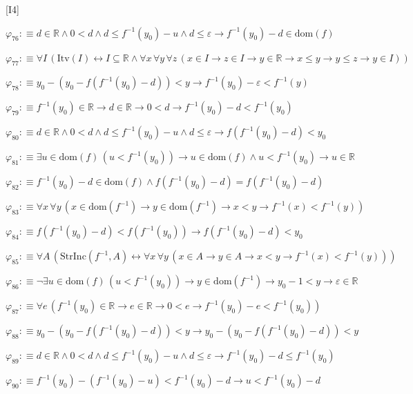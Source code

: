 \begin{fullproof}{[I4]}
\begin{abbrevlist}
\item $\varphi_{76} :\equiv d \in \mathbb{R} \land 0 < d \land d \leq f^{-1}(y_{0}) - u \land d \leq \varepsilon \to f^{-1}(y_{0}) - d \in \mathrm{dom}(f)$
\item $\varphi_{77} :\equiv \forall I\,(\mathrm{Itv}(I) \leftrightarrow I \subseteq \mathbb{R} \land \forall x\,\forall y\,\forall z\,(x \in I \to z \in I \to y \in \mathbb{R} \to x \leq y \to y \leq z \to y \in I))$
\item $\varphi_{78} :\equiv y_{0} - (y_{0} - f(f^{-1}(y_{0}) - d)) < y \to f^{-1}(y_{0}) - \varepsilon < f^{-1}(y)$
\item $\varphi_{79} :\equiv f^{-1}(y_{0}) \in \mathbb{R} \to d \in \mathbb{R} \to 0 < d \to f^{-1}(y_{0}) - d < f^{-1}(y_{0})$
\item $\varphi_{80} :\equiv d \in \mathbb{R} \land 0 < d \land d \leq f^{-1}(y_{0}) - u \land d \leq \varepsilon \to f(f^{-1}(y_{0}) - d) < y_{0}$
\item $\varphi_{81} :\equiv \exists u \in \mathrm{dom}(f)\,(u < f^{-1}(y_{0})) \to u \in \mathrm{dom}(f) \land u < f^{-1}(y_{0}) \to u \in \mathbb{R}$
\item $\varphi_{82} :\equiv f^{-1}(y_{0}) - d \in \mathrm{dom}(f) \land f(f^{-1}(y_{0}) - d) = f(f^{-1}(y_{0}) - d)$
\item $\varphi_{83} :\equiv \forall x\,\forall y\,(x \in \mathrm{dom}(f^{-1}) \to y \in \mathrm{dom}(f^{-1}) \to x < y \to f^{-1}(x) < f^{-1}(y))$
\item $\varphi_{84} :\equiv f(f^{-1}(y_{0}) - d) < f(f^{-1}(y_{0})) \to f(f^{-1}(y_{0}) - d) < y_{0}$
\item $\varphi_{85} :\equiv \forall A\,(\mathrm{StrInc}(f^{-1},A) \leftrightarrow \forall x\,\forall y\,(x \in A \to y \in A \to x < y \to f^{-1}(x) < f^{-1}(y)))$
\item $\varphi_{86} :\equiv \neg \exists u \in \mathrm{dom}(f)\,(u < f^{-1}(y_{0})) \to y \in \mathrm{dom}(f^{-1}) \to y_{0} - 1 < y \to \varepsilon \in \mathbb{R}$
\item $\varphi_{87} :\equiv \forall e\,(f^{-1}(y_{0}) \in \mathbb{R} \to e \in \mathbb{R} \to 0 < e \to f^{-1}(y_{0}) - e < f^{-1}(y_{0}))$
\item $\varphi_{88} :\equiv y_{0} - (y_{0} - f(f^{-1}(y_{0}) - d)) < y \to y_{0} - (y_{0} - f(f^{-1}(y_{0}) - d)) < y$
\item $\varphi_{89} :\equiv d \in \mathbb{R} \land 0 < d \land d \leq f^{-1}(y_{0}) - u \land d \leq \varepsilon \to f^{-1}(y_{0}) - d \leq f^{-1}(y_{0})$
\item $\varphi_{90} :\equiv f^{-1}(y_{0}) - (f^{-1}(y_{0}) - u) < f^{-1}(y_{0}) - d \to u < f^{-1}(y_{0}) - d$

\end{abbrevlist}
\end{fullproof}
